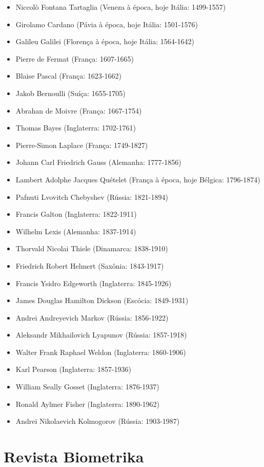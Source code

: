 \documentclass[
]{book}
\providecommand{\tightlist}{%
  \setlength{\itemsep}{0pt}\setlength{\parskip}{0pt}}
\theoremstyle{definition}
\theoremstyle{definition}
\theoremstyle{definition}
\theoremstyle{definition}
\theoremstyle{remark}
\begin{document}
\begin{itemize}
\tightlist
\item
  Niccolò Fontana Tartaglia (Veneza à época, hoje Itália: 1499-1557)
\item
  Girolamo Cardano (Pávia à época, hoje Itália: 1501-1576)
\item
  Galileu Galilei (Florença à época, hoje Itália: 1564-1642)
\item
  Pierre de Fermat (França: 1607-1665)
\item
  Blaise Pascal (França: 1623-1662)
\item
  Jakob Bernoulli (Suíça: 1655-1705)
\item
  Abrahan de Moivre (França: 1667-1754)
\item
  Thomas Bayes (Inglaterra: 1702-1761)
\item
  Pierre-Simon Laplace (França: 1749-1827)
\item
  Johann Carl Friedrich Gauss (Alemanha: 1777-1856)
\item
  Lambert Adolphe Jacques Quételet (França à época, hoje Bélgica: 1796-1874)
\item
  Pafnuti Lvovitch Chebyshev (Rússia: 1821-1894)
\item
  Francis Galton (Inglaterra: 1822-1911)
\item
  Wilhelm Lexis (Alemanha: 1837-1914)
\item
  Thorvald Nicolai Thiele (Dinamarca: 1838-1910)
\item
  Friedrich Robert Helmert (Saxônia: 1843-1917)
\item
  Francis Ysidro Edgeworth (Inglaterra: 1845-1926)
\item
  James Douglas Hamilton Dickson (Escócia: 1849-1931)
\item
  Andrei Andreyevich Markov (Rússia: 1856-1922)
\item
  Aleksandr Mikhailovich Lyapunov (Rússia: 1857-1918)
\item
  Walter Frank Raphael Weldon (Inglaterra: 1860-1906)
\item
  Karl Pearson (Inglaterra: 1857-1936)
\item
  William Seally Gosset (Inglaterra: 1876-1937)
\item
  Ronald Aylmer Fisher (Inglaterra: 1890-1962)
\item
  Andrei Nikolaevich Kolmogorov (Rússia: 1903-1987)
\end{itemize}

\hypertarget{revista-biometrika}{%
\section{Revista Biometrika}\label{revista-biometrika}}
\end{document}
